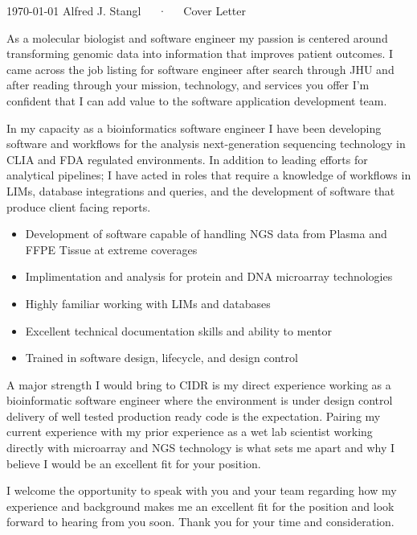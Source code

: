 \documentclass[11pt, letterpaper]{awesome-cv}
\begin{document}
\makecvheader[L]

\makecvfooter
  {\today}
  {Alfred J. Stangl~~~·~~~Cover Letter}
  {}

\makelettertitle

\begin{cvletter}

As a molecular biologist and software engineer my passion is centered around transforming genomic data into information that improves patient outcomes. I came across the job listing for software engineer after search through JHU and after reading through your mission, technology, and services you offer I'm confident that I can add value to the software application development team.

In my capacity as a bioinformatics software engineer I have been developing software and workflows for the analysis next-generation sequencing technology in CLIA and FDA regulated environments. In addition to leading efforts for analytical pipelines; I have acted in roles that require a knowledge of workflows in LIMs, database integrations and queries, and the development of software that produce client facing reports.
\begin{itemize}
  \item Development of software capable of handling NGS data from Plasma and FFPE Tissue at extreme coverages
  \item Implimentation and analysis for protein and DNA microarray technologies
  \item Highly familiar working with LIMs and databases
  \item Excellent technical documentation skills and ability to mentor
  \item Trained in software design, lifecycle, and design control
\end{itemize}
A major strength I would bring to CIDR is my direct experience working as a bioinformatic software engineer where the environment is under design control delivery of well tested production ready code is the expectation. Pairing my current experience with my prior experience as a wet lab scientist working directly with microarray and NGS technology is what sets me apart and why I believe I would be an excellent fit for your position.

I welcome the opportunity to speak with you and your team regarding how my experience and background makes me an excellent fit for the position and look forward to hearing from you soon. Thank you for your time and consideration.

\end{cvletter}


\makeletterclosing
\end{document}
